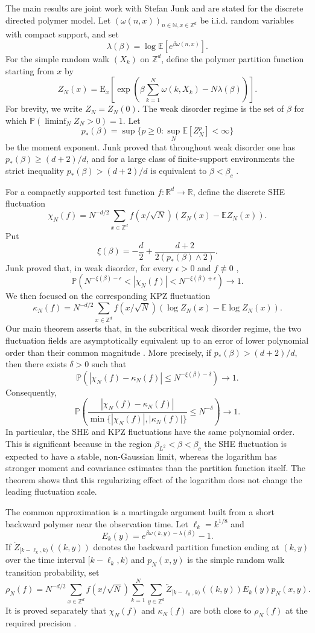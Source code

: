 \documentclass[12pt,centertags,oneside]{amsart}
\numberwithin{equation}{section}
\newcommand{\R}{\mathbb R}
\newcommand{\Z}{\mathbb Z}
\newcommand{\N}{\mathbb N}
\newcommand{\E}{\mathbb E}
\renewcommand{\P}{\mathbb P}
\begin{document}
The main results are joint work with Stefan Junk and are stated for the discrete directed polymer model. Let $(\omega(n,x))_{n\in\N,x\in\Z^d}$ be i.i.d. random variables with compact support, and set
$$
\lambda(\beta)=\log \E[e^{\beta\omega(n,x)}].
$$
For the simple random walk $(X_k)$ on $\Z^d$, define the polymer partition function starting from $x$ by
$$
Z_N(x)=\mathrm E_x\left[\exp\left(\beta\sum_{k=1}^N\omega(k,X_k)-N\lambda(\beta)\right)\right].
$$
For brevity, we write $Z_N=Z_N(0)$. The weak disorder regime is the set of $\beta$ for which $\P(\liminf_N Z_N>0)=1$. Let
$$
p_*(\beta)=\sup\{p\geq 0:\sup_N \E[Z_N^p]<\infty\}
$$
be the moment exponent. Junk proved that throughout weak disorder one has $p_*(\beta)\geq (d+2)/d$, and for a large class of finite-support environments the strict inequality $p_*(\beta)>(d+2)/d$ is equivalent to $\beta<\beta_c$ \cite{Junk2025AOP}.

For a compactly supported test function $f:\R^d\to\R$, define the discrete SHE fluctuation
$$
\chi_N(f)=N^{-d/2}\sum_{x\in\Z^d}f(x/\sqrt N)(Z_N(x)-\E Z_N(x)).
$$
Put
$$
\xi(\beta)=-\frac d2+\frac{d+2}{2(p_*(\beta)\wedge 2)}.
$$
Junk proved that, in weak disorder, for every $\epsilon>0$ and $f\not\equiv 0$ \cite{Junk2025AOP},
$$
\P\left(N^{-\xi(\beta)-\epsilon}<|\chi_N(f)|<N^{-\xi(\beta)+\epsilon}\right)\longrightarrow 1.
$$
We then focused on the corresponding KPZ fluctuation
$$
\kappa_N(f)=N^{-d/2}\sum_{x\in\Z^d}f(x/\sqrt N)
\left(\log Z_N(x)-\E\log Z_N(x)\right).
$$
Our main theorem asserts that, in the subcritical weak disorder regime, the two fluctuation fields are asymptotically equivalent up to an error of lower polynomial order than their common magnitude \cite{JunkNakajima2025}. More precisely, if $p_*(\beta)>(d+2)/d$, then there exists $\delta>0$ such that
$$
\P\left(|\chi_N(f)-\kappa_N(f)|\leq N^{-\xi(\beta)-\delta}\right)\longrightarrow 1.
$$
Consequently,
$$
\P\left(
\frac{|\chi_N(f)-\kappa_N(f)|}{\min\{|\chi_N(f)|,|\kappa_N(f)|\}}\leq N^{-\delta}
\right)\longrightarrow 1.
$$
In particular, the SHE and KPZ fluctuations have the same polynomial order. This is significant because in the region $\beta_{L^2}<\beta<\beta_c$ the SHE fluctuation is expected to have a stable, non-Gaussian limit, whereas the logarithm has stronger moment and covariance estimates than the partition function itself. The theorem shows that this regularizing effect of the logarithm does not change the leading fluctuation scale.

The common approximation is a martingale argument built from a short backward polymer near the observation time. Let $\ell_k=k^{1/8}$ and
$$
E_k(y)=e^{\beta\omega(k,y)-\lambda(\beta)}-1.
$$
If $\overleftarrow Z_{[k-\ell_k,k)}((k,y))$ denotes the backward partition function ending at $(k,y)$ over the time interval $[k-\ell_k,k)$ and $p_N(x,y)$ is the simple random walk transition probability, set
$$
\rho_N(f)=N^{-d/2}\sum_{x\in\Z^d}f(x/\sqrt N)
\sum_{k=1}^N\sum_{y\in\Z^d}
\overleftarrow Z_{[k-\ell_k,k)}((k,y))E_k(y)p_N(x,y).
$$
It is proved separately that $\chi_N(f)$ and $\kappa_N(f)$ are both close to $\rho_N(f)$ at the required precision \cite{JunkNakajima2025}.
\end{document}
